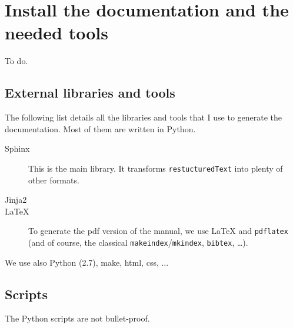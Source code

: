 \documentclass[a4paper,10pt]{article}
\begin{document}
\section{Install the documentation and the needed tools}
\label{installation}

To do.

\subsection{External libraries and tools}

The following list details all the libraries and tools that I use to generate the documentation. Most of them are written in Python.

\begin{description}
 \item[Sphinx] This is the main library. It transforms \verb+restucturedText+ into plenty of other formats.
 \item[Jinja2] 
 \item[\LaTeX] To generate the pdf version of the manual, we use \LaTeX{} and \verb+pdflatex+ (and of course, the classical \verb+makeindex+/\verb+mkindex+, \verb+bibtex+, \ldots).
 \end{description}

We use also Python (2.7), make, html, css, ...

\subsection{Scripts}
The Python scripts are not bullet-proof.\\

% 
% 
\end{document}
